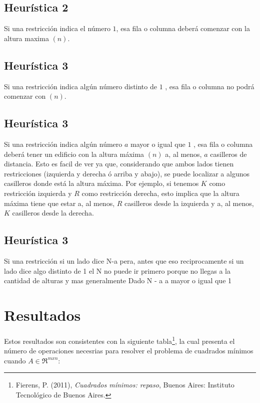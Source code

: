 \documentclass[%
	final,
	reprint,
	notitlepage,
	narroweqnarray,
	inline,
	twoside,
	invited
	]{ieee}
\begin{document}
\subsection{Heurística 2}

\par Si una restricción indica el número $1$, esa fila o columna deberá comenzar con la altura maxima $(n)$.

\subsection{Heurística 3}

\par Si una restricción indica algún número distinto de $1$ , esa fila o columna no podrá comenzar con $(n)$.

\subsection{Heurística 3}

\par Si una restricción indica algún número $a$ mayor o igual que $1$ , esa fila o columna deberá tener un edificio con la altura máxima $(n)$ a, al menos, $a$ casilleros de distancia. Esto es facil de ver ya que, considerando que ambos lados tienen restricciones (izquierda y derecha ó arriba y abajo), se puede localizar a algunos casilleros donde está la altura máxima. Por ejemplo, si tenemos $K$ como restricción izquierda y $R$ como restricción derecha, esto implica que la altura máxima tiene que estar a, al menos, $R$ casilleros desde la izquierda y a, al menos, $K$ casilleros desde la derecha.

\subsection{Heurística 3}
\par Si una restricción 
si un lado dice N-a
pera, antes que eso
reciprocamente
si un lado dice algo distinto de 1
el N no puede ir primero
porque no llegas a la cantidad de alturas
y mas generalmente
Dado N - a
a mayor o igual que 1


\section{Resultados}


Estos resultados son consistentes con la siguiente tabla\footnote{Fierens, P. (2011), \emph{Cuadrados mínimos: repaso}, Buenos Aires: Instituto Tecnológico de Buenos Aires.}, la cual presenta el número de operaciones necesrias para resolver el problema de cuadrados mínimos cuando $A \in \Re ^{mxn}$:
\end{document}

